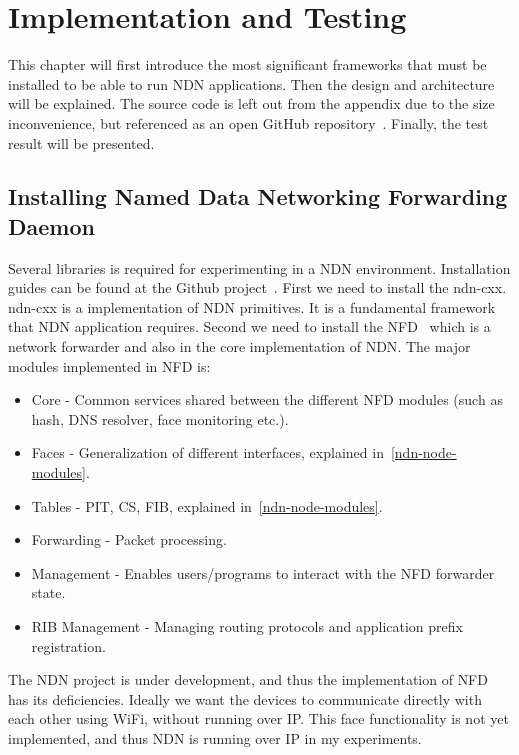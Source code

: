 \chapter{Implementation and Testing}
This chapter will first introduce the most significant frameworks that must be installed to be able to run \gls{NDN} applications.
Then the design and architecture will be explained.
The source code is left out from the appendix due to the size inconvenience, but referenced as an open GitHub repository~\cite{garseg15}. 
Finally, the test result will be presented.

\section{Installing Named Data Networking Forwarding Daemon}

Several libraries is required for experimenting in a \gls{NDN} environment.
Installation guides can be found at the Github project~\cite{ndn-git}.
First we need to install the \gls{ndn-cxx}.
\gls{ndn-cxx} is a implementation of \gls{NDN} primitives. 
It is a fundamental framework that \gls{NDN} application requires. 
Second we need to install the \gls{NFD}~\cite{nfd} which is a network forwarder and also in the core implementation of \gls{NDN}.
The major modules implemented in \gls{NFD} is:
\begin{itemize}
  \item Core - Common services shared between the different \gls{NFD} modules (such as hash, \gls{DNS} resolver, face monitoring etc.).
  \item Faces - Generalization of different interfaces, explained in~\autoref{ndn-node-modules}.
  \item Tables - \gls{PIT}, \gls{CS}, \gls{FIB}, explained in~\autoref{ndn-node-modules}.
  \item Forwarding - Packet processing.
  \item Management - Enables users/programs to interact with the \gls{NFD} forwarder state.
  \item\gls{RIB} Management - Managing routing protocols and application prefix registration.
\end{itemize}
The \gls{NDN} project is under development, and thus the implementation of \gls{NFD} has its deficiencies.
Ideally we want the devices to communicate directly with each other using WiFi, without running over \gls{IP}. 
This face functionality is not yet implemented, and thus \gls{NDN} is running over \gls{IP} in my experiments.

